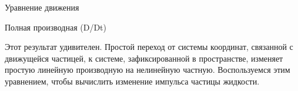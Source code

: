 \begin{chapter}{Уравнение движения}
\begin{section}{Полная производная (D/Dt)}

Этот результат удивителен. Простой переход от системы координат,
связанной с движущейся частицей, к системе, зафиксированной в
пространстве, изменяет простую линейную производную на нелинейную
частную. Воспользуемся этим уравнением, чтобы вычислить
изменение импульса частицы жидкости.
%
\end{section}


\end{chapter}
